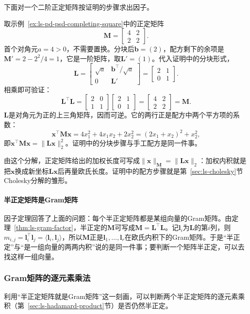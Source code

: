 下面对一个二阶正定矩阵按证明的步骤求出因子。
\begin{example}[二阶正定矩阵的配方因子]
\label{ex:ls-gram-factor-two-by-two}
取示例~\ref{ex:ls-pd-psd-completing-square}中的正定矩阵
\[
 \bm M=\begin{bmatrix}4&2\\2&2\end{bmatrix}.
\]
首个对角元$a=4>0$，不需要置换。分块后$\bm b=(2)$，配方剩下的余项是$\bm M'=2-2^2/4=1$，它是一阶矩阵，取$\bm L'=(1)$。代入证明中的分块形式，
\[
 \bm L=\begin{bmatrix}\sqrt a&\bm b^\top/\sqrt a\\ 0&\bm L'\end{bmatrix}=\begin{bmatrix}2&1\\0&1\end{bmatrix}.
\]
相乘即可验证：
\[
 \bm L^\top\bm L=\begin{bmatrix}2&0\\1&1\end{bmatrix}\begin{bmatrix}2&1\\0&1\end{bmatrix}=\begin{bmatrix}4&2\\2&2\end{bmatrix}=\bm M.
\]
$\bm L$是对角元为正的上三角矩阵，因而可逆。它的两行正是配方中两个平方项的系数：
\[
 \bm x^\top\bm M\bm x=4x_1^2+4x_1x_2+2x_2^2=(2x_1+x_2)^2+x_2^2 ,
\]
即$\bm x^\top\bm M\bm x=\lVert\bm L\bm x\rVert_2^2$。证明中的分块步骤与手工配方是同一件事。
\end{example}
由这个分解，正定矩阵给出的加权长度可写成$\lVert\bm x\rVert_{\bm M}=\lVert\bm L\bm x\rVert_2$：加权内积就是把$\bm x$换成新坐标$\bm L\bm x$后再量欧氏长度。证明中的配方步骤就是第~\ref{sec:ls-cholesky}节Cholesky分解的雏形。

\paragraph{半正定矩阵是Gram矩阵}
因子定理回答了上面的问题：每个半正定矩阵都是某组向量的Gram矩阵。由定理~\ref{thm:ls-gram-factor}，半正定的$\bm M$可写成$\bm M=\bm L^\top\bm L$。记$\bm l_i$为$\bm L$的第$i$列，则$m_{i,j}=\bm l_i^\top\bm l_j=\langle\bm l_i,\bm l_j\rangle$，所以$\bm M$正是$\bm l_1,\ldots,\bm l_r$在欧氏内积下的Gram矩阵。于是“半正定”与“是一组向量的两两内积”说的是同一件事；要判断一个矩阵半正定，可以去找这样一组向量。

\subsubsection{Gram矩阵的逐元素乘法}
\label{sec:ls-schur-product}
利用“半正定矩阵就是Gram矩阵”这一刻画，可以判断两个半正定矩阵的逐元素乘积（第~\ref{sec:ls-hadamard-product}节）是否仍然半正定。

